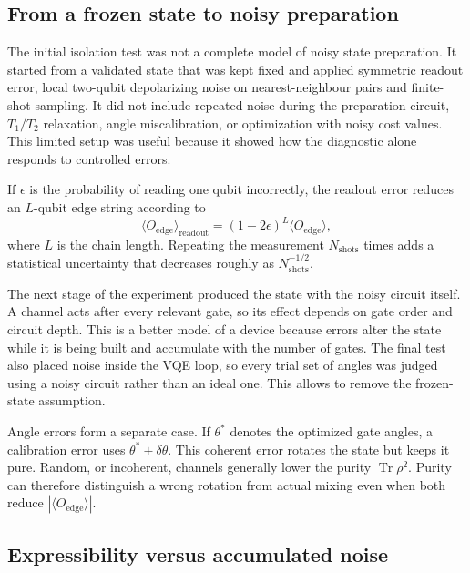 \subsection{From a frozen state to noisy preparation}

The initial isolation test was not a complete model of noisy state
preparation.  It started from a validated state that was kept fixed and applied
symmetric readout error, local two-qubit depolarizing noise on nearest-neighbour
pairs and finite-shot sampling.  It did not include repeated noise during the
preparation circuit, $T_1/T_2$ relaxation, angle miscalibration, or optimization
with noisy cost values.  This limited setup was useful because it showed how the
diagnostic alone responds to controlled errors.

If $\epsilon$ is the probability of reading one qubit incorrectly, the
readout error reduces an $L$-qubit edge string according to
\begin{equation}
  \langle O_{\mathrm{edge}}\rangle_{\mathrm{readout}}
  =(1-2\epsilon)^L\langle O_{\mathrm{edge}}\rangle,
  \label{eq:readout}
\end{equation}
where $L$ is the chain length.  Repeating the measurement
$N_{\mathrm{shots}}$ times adds a statistical uncertainty that decreases roughly
as $N_{\mathrm{shots}}^{-1/2}$.

The next stage of the experiment produced the state with the noisy circuit itself.  A channel
acts after every relevant gate, so its effect depends on gate order and circuit
depth.  This is a better model of a device because errors alter the state while
it is being built and accumulate with the number of gates.  The final test also
placed noise inside the VQE loop, so every trial set of angles was judged using
a noisy circuit rather than an ideal one.  This allows to 
remove the frozen-state assumption.

Angle errors form a separate case.  If $\theta^*$ denotes the optimized gate
angles, a calibration error uses $\theta^*+\delta\theta$.  This coherent error
rotates the state but keeps it pure.  Random, or incoherent, channels generally
lower the purity $\operatorname{Tr}\rho^2$.  Purity can therefore distinguish a
wrong rotation from actual mixing even when both reduce
$|\langle O_{\mathrm{edge}}\rangle|$.

\subsection{Expressibility versus accumulated noise}

